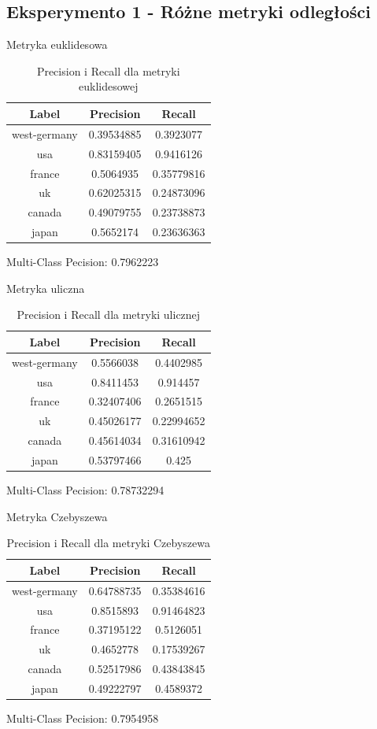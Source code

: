 \documentclass{classrep}
\begin{document}
\subsection{Eksperymento 1 - Różne metryki odległości}
Metryka euklidesowa
\begin{table}[H]
\begin{tabular}{|c|c|c|}
\hline
Label        & Precision  & Recall     \\ \hline
west-germany & 0.39534885 & 0.3923077  \\ \hline
usa          & 0.83159405 & 0.9416126  \\ \hline
france       & 0.5064935  & 0.35779816 \\ \hline
uk           & 0.62025315 & 0.24873096 \\ \hline
canada       & 0.49079755 & 0.23738873 \\ \hline
japan        & 0.5652174  & 0.23636363 \\ \hline
\end{tabular}
\caption{Precision i Recall dla metryki euklidesowej}
\end{table}
Multi-Class Pecision: 0.7962223

Metryka uliczna
\begin{table}[H]
\begin{tabular}{|c|c|c|}
\hline
Label        & Precision  & Recall     \\ \hline
west-germany & 0.5566038  & 0.4402985  \\ \hline
usa          & 0.8411453  & 0.914457   \\ \hline
france       & 0.32407406 & 0.2651515  \\ \hline
uk           & 0.45026177 & 0.22994652 \\ \hline
canada       & 0.45614034 & 0.31610942 \\ \hline
japan        & 0.53797466 & 0.425      \\ \hline
\end{tabular}
\caption{Precision i Recall dla metryki ulicznej}
\end{table}
Multi-Class Pecision: 0.78732294

Metryka Czebyszewa
\begin{table}[H]
\begin{tabular}{|c|c|c|}
\hline
Label        & Precision  & Recall     \\ \hline
west-germany & 0.64788735 & 0.35384616 \\ \hline
usa          & 0.8515893  & 0.91464823 \\ \hline
france       & 0.37195122 & 0.5126051  \\ \hline
uk           & 0.4652778  & 0.17539267 \\ \hline
canada       & 0.52517986 & 0.43843845 \\ \hline
japan        & 0.49222797 & 0.4589372  \\ \hline
\end{tabular}
\caption{Precision i Recall dla metryki Czebyszewa}
\end{table}
Multi-Class Pecision: 0.7954958
\end{document}
